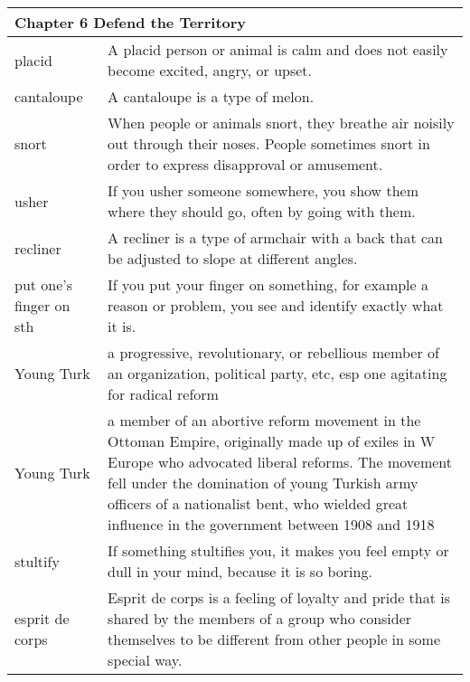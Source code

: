 \documentclass{article}
\begin{document}
\begin{center}
\begin{longtable}{|l|p{7.8cm}|}

\hline
\multicolumn{2}{|l|}{\textbf{Chapter 6 Defend the Territory}}
\\

\hline
placid
&
A placid person or animal is calm and does not easily become excited, angry, or upset.
\\

\hline
cantaloupe
&
A cantaloupe is a type of melon.
\\

\hline
snort
&
When people or animals snort, they breathe air noisily out through their noses. People sometimes snort in order to express disapproval or amusement.
\\

\hline
usher
&
If you usher someone somewhere, you show them where they should go, often by going with them.
\\

\hline
recliner
&
A recliner is a type of armchair with a back that can be adjusted to slope at different angles.
\\

\hline
put one's finger on sth
&
If you put your finger on something, for example a reason or problem, you see and identify exactly what it is.
\\

\hline
Young Turk
&
a progressive, revolutionary, or rebellious member of an organization, political party, etc, esp one agitating for radical reform
\\

\hline
Young Turk
&
a member of an abortive reform movement in the Ottoman Empire, originally made up of exiles in W Europe who advocated liberal reforms. The movement fell under the domination of young Turkish army officers of a nationalist bent, who wielded great influence in the government between 1908 and 1918
\\

\hline
stultify
&
If something stultifies you, it makes you feel empty or dull in your mind, because it is so boring.
\\

\hline
esprit de corps
&
Esprit de corps is a feeling of loyalty and pride that is shared by the members of a group who consider themselves to be different from other people in some special way.
\\


\end{longtable}
\end{center}
\end{document}
